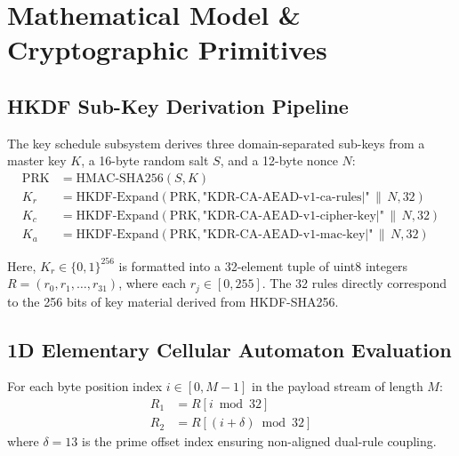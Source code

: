 \section{Mathematical Model \& Cryptographic Primitives}
\label{sec:methodology}

\subsection{HKDF Sub-Key Derivation Pipeline}
\label{subsec:hkdf_pipeline}
The key schedule subsystem derives three domain-separated sub-keys from a master key $K$, a 16-byte random salt $S$, and a 12-byte nonce $N$:
\begin{align}
\text{PRK} &= \text{HMAC-SHA256}(S, K) \label{eq:hkdf_extract} \\
K_r &= \text{HKDF-Expand}(\text{PRK}, \text{"KDR-CA-AEAD-v1-ca-rules|"} \,\|\, N, 32) \label{eq:hkdf_kr} \\
K_c &= \text{HKDF-Expand}(\text{PRK}, \text{"KDR-CA-AEAD-v1-cipher-key|"} \,\|\, N, 32) \label{eq:hkdf_kc} \\
K_a &= \text{HKDF-Expand}(\text{PRK}, \text{"KDR-CA-AEAD-v1-mac-key|"} \,\|\, N, 32) \label{eq:hkdf_ka}
\end{align}

Here, $K_r \in \{0,1\}^{256}$ is formatted into a 32-element tuple of uint8 integers $R = (r_0, r_1, \dots, r_{31})$, where each $r_j \in [0, 255]$. The 32 rules directly correspond to the 256 bits of key material derived from HKDF-SHA256.

\subsection{1D Elementary Cellular Automaton Evaluation}
\label{subsec:eca_eval}
For each byte position index $i \in [0, M-1]$ in the payload stream of length $M$:
\begin{align}
R_1 &= R[i \bmod 32] \label{eq:r1_select} \\
R_2 &= R[(i + \delta) \bmod 32] \label{eq:r2_select}
\end{align}
where $\delta = 13$ is the prime offset index ensuring non-aligned dual-rule coupling.

